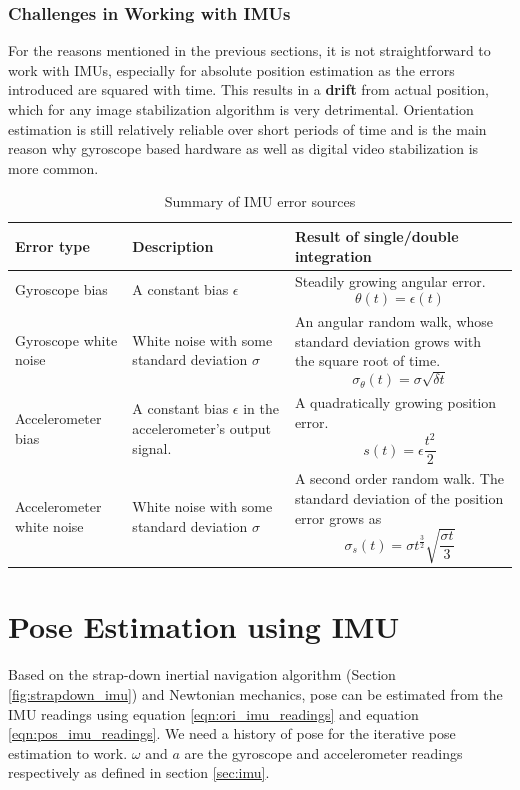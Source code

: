 \subsubsection{Challenges in Working with IMUs}
For the reasons mentioned in the previous sections, it is not straightforward to work with IMUs, especially for absolute position estimation as the errors introduced are squared with time. This results in a \textbf{drift} from actual position, which for any image stabilization algorithm is very detrimental. Orientation estimation is still relatively reliable over short periods of time and is the main reason why gyroscope based hardware as well as digital video stabilization is more common.

\begin{table}[H]
\centering
\begin{tabular}{| l| L| L |}
     \hline
     \textbf{Error type} & \textbf{Description} & \textbf{Result of single/double integration} \\ 
     \hline
     Gyroscope bias & 
     A constant bias $ \epsilon $ & 
     Steadily growing angular error.  \[\theta(t) = \epsilon(t)\] \\
     \hline
     Gyroscope white noise & 
     White noise with some standard deviation $ \sigma $ & 
     An angular random walk, whose standard deviation grows with the square root of time. 
     \[\sigma_\theta(t) = \sigma \sqrt{\delta t}\] \\
     
     \hline
     Accelerometer bias & 
     A constant bias $ \epsilon $ in the accelerometer's output signal. & 
     A quadratically growing position error. \[s(t) = \epsilon  \frac{t^{2}}{2}\]   \\
     \hline
     Accelerometer white noise & 
     White noise with some standard deviation $ \sigma $ & 
     A second order random walk. The standard deviation of the position error grows as
     \[\sigma_s(t) = \sigma  t^{\frac{3}{2}}  \sqrt{\frac{\sigma  t}{3}}\]   \\

     \hline
     
\end{tabular}
    \caption{Summary of IMU error sources \citep{woodman2007introduction}}
    \label{tab:imu_error_char}
\end{table}



\section{Pose Estimation using IMU}
\label{sec:pose_estimation_imu}
Based on the strap-down inertial navigation algorithm (Section \ref{fig:strapdown_imu}) and Newtonian mechanics, pose can be estimated from the IMU readings using equation \ref{eqn:ori_imu_readings} and equation \ref{eqn:pos_imu_readings}. We need a history of pose for the iterative pose estimation to work. $ \omega $ and $ a $ are the gyroscope and accelerometer readings respectively as defined in section \ref{sec:imu}.

